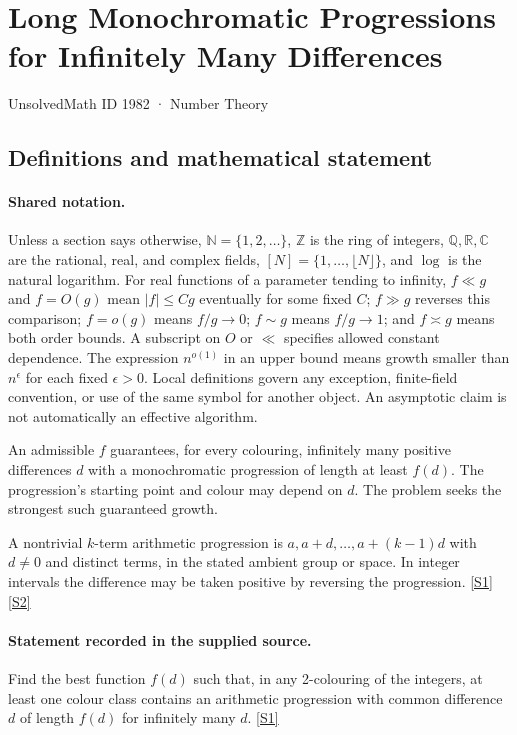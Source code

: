 \documentclass[11pt,a4paper]{article}
\newcommand{\N}{\mathbb{N}}
\newcommand{\Z}{\mathbb{Z}}
\newcommand{\Q}{\mathbb{Q}}
\newcommand{\R}{\mathbb{R}}
\newcommand{\C}{\mathbb{C}}
\newcommand{\sref}[2]{\hyperlink{source:#1:#2}{[S#2]}}
\begin{document}

\setcounter{section}{1981}

\section{Long Monochromatic Progressions for Infinitely Many Differences}\label{1982}

{\small\sffamily UnsolvedMath ID 1982 · Number Theory}

\subsection{Definitions and mathematical statement}

\paragraph{Shared notation.}Unless a section says otherwise, $\N=\{1,2,\ldots\}$,
$\Z$ is the ring of integers, $\Q,\R,\C$ are the rational, real, and complex
fields, $[N]=\{1,\ldots,\lfloor N\rfloor\}$, and $\log$ is the natural
logarithm. For real functions of a parameter tending to infinity,
$f\ll g$ and $f=O(g)$ mean $|f|\leq Cg$ eventually for some fixed $C$;
$f\gg g$ reverses this comparison; $f=o(g)$ means $f/g\to0$;
$f\sim g$ means $f/g\to1$; and $f\asymp g$ means both order bounds.
A subscript on $O$ or $\ll$ specifies allowed constant dependence.
The expression $n^{o(1)}$ in an upper bound means growth smaller than
$n^\epsilon$ for each fixed $\epsilon>0$. Local definitions govern any
exception, finite-field convention, or use of the same symbol for another
object. An asymptotic claim is not automatically an effective algorithm.



An admissible $f$ guarantees, for every colouring, infinitely many positive differences $d$ with a monochromatic progression of length at least $f(d)$. The progression's starting point and colour may depend on $d$. The problem seeks the strongest such guaranteed growth.

A nontrivial $k$-term arithmetic progression is $a,a+d,\ldots,a+(k-1)d$ with $d\ne0$ and distinct terms, in the stated ambient group or space. In integer intervals the difference may be taken positive by reversing the progression. \sref{1982}{1} \sref{1982}{2}

\paragraph{Statement recorded in the supplied source.}
Find the best function $f(d)$ such that, in any 2-colouring of the integers, at least one colour class contains an arithmetic progression with common difference $d$ of length $f(d)$ for infinitely many $d$. \sref{1982}{1}
\end{document}
